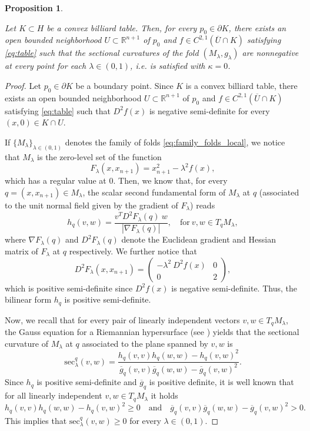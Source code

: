 \documentclass[11pt]{article}
\theoremstyle{definition}
\theoremstyle{remark}
\theoremstyle{plain}
\newtheorem{proposition}[definition]{Proposition}
\newcommand{\R}{\mathbb{R}}
\newcommand{\M}{M_\lambda}
\begin{document}
\begin{proposition}\label{prop:convex_billiards}

Let $K\subset H$ be a convex billiard table. Then, for every $p_0\in \partial K$, there exists an open bounded neighborhood $U\subset \R^{n+1}$ of $p_0$ and $f\in C^{2,1}(\overline{U}\cap K)$ satisfying \cref{eq:table} such that the sectional curvatures of the fold $(\M,g_\lambda)$ are nonnegative at every point for each $\lambda\in (0,1)$, i.e.  is satisfied with $\kappa = 0$.

\end{proposition}

\begin{proof}
  
Let $p_0\in \partial K$ be a boundary point. Since $K$ is a convex billiard table, there exists an open bounded neighborhood $U\subset \R^{n+1}$ of $p_0$ and $f\in C^{2,1}(\overline{U}\cap K)$ satisfying \cref{eq:table} such that $D^2f(x)$ is negative semi-definite for every $(x,0)\in K\cap U$. 

If $\{\M\}_{\lambda\in (0,1)}$ denotes the family of folds \eqref{eq:family_folds_local}, we notice that $\M$ is the zero-level set of the function
$$F_\lambda(x,x_{n+1}) = x_{n+1}^2 -\lambda^2 f(x),$$
which has a regular value at $0$. Then, we know that, for every $q=(x,x_{n+1})\in \M$, the scalar second fundamental form of $\M$ at $q$ (associated to the unit normal field given by the gradient of $F_\lambda$) reads
$$h_q(v,w)= \frac{v^TD^2F_\lambda(q)\ w}{|\nabla F_\lambda(q)|}, \quad \text{for}\ v,w\in T_q\M,$$
where $\nabla F_\lambda(q)$ and $D^2F_\lambda(q)$ denote the Euclidean gradient and Hessian matrix of $F_\lambda$ at $q$ respectively.
We further notice that
$$D^2F_\lambda(x,x_{n+1}) = \begin{pmatrix}-\lambda^2 \ D^2f(x) & 0\\ 0 & 2\end{pmatrix},$$
which is positive semi-definite since $D^2f(x)$ is negative semi-definite. Thus, the bilinear form $h_q$ is positive semi-definite.

Now, we recall that for every pair of linearly independent vectors $v,w\in T_q\M$, the Gauss equation for a Riemannian hypersurface (see \cite[Theorem 8.13]{LeeRiemannian}) yields that the sectional curvature of $\M$ at $q$ associated to the plane spanned by $v,w$ is
$$\mbox{sec}^q_\lambda(v,w) = \frac{h_q(v,v)h_q(w,w)- h_q(v,w)^2}{\overline{g}_q(v,v)\overline{g}_q(w,w)- \overline{g}_q(v,w)^2}.$$
Since $h_q$ is positive semi-definite and $\overline{g}_q$ is positive definite, it is well known that for all linearly independent $v,w\in T_q\M$ it holds
$$h_q(v,v)h_q(w,w)- h_q(v,w)^2\ge 0 \quad \text{and}\quad \overline{g}_q(v,v)\overline{g}_q(w,w)- \overline{g}_q(v,w)^2>0.$$ 
This implies that $\mbox{sec}_\lambda^q(v,w)\ge 0$ for every $\lambda\in (0,1)$.

\end{proof}
\end{document}
